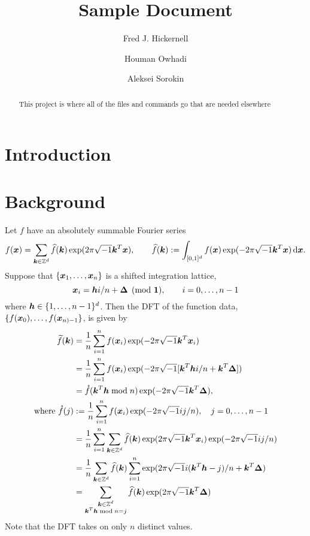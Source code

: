 \documentclass{amsart}
\begin{document}
\title{Sample Document}
\author{Fred J. Hickernell}
\author{Houman Owhadi}
\author{Aleksei Sorokin}
\begin{abstract}This project is where all of the files and commands go that are needed elsewhere
\end{abstract}

\maketitle

\section{Introduction}

\section{Background}
Let $f$ have an absolutely summable Fourier series
\begin{equation*}
    f(\boldsymbol{x}) = \sum_{\boldsymbol{k} \in \mathbb{Z}^d} \widehat{f}(\boldsymbol{k}) \exp(2 \pi \sqrt{-1} \boldsymbol{k}^T \boldsymbol{x}), \qquad \widehat{f}(\boldsymbol{k}) : = \int_{[0,1]^d} f(\boldsymbol{x})  \exp(-2 \pi \sqrt{-1} \boldsymbol{k}^T \boldsymbol{x}) \, {\rm d} \boldsymbol{x}.
\end{equation*}
Suppose that $\{ \boldsymbol{x}_1, \ldots, \boldsymbol{x}_n\}$ is a shifted integration lattice, 
\begin{equation*}
    \boldsymbol{x}_i = \boldsymbol{h} i /n + \boldsymbol{\Delta} \pmod {\boldsymbol{1}}, \qquad i = 0, \ldots, n - 1
\end{equation*}
where $\boldsymbol{h} \in \{1, \ldots, n-1\}^d$.  Then the DFT of the function data, $\{ f(\boldsymbol{x}_0), \ldots, f(\boldsymbol{x}_{n)-1}\}$, is given by 
\begin{align*}
    \widetilde{f}(\boldsymbol{k}) &= \frac 1n \sum_{i=1}^n f(\boldsymbol{x}_i) \exp(-2 \pi \sqrt{-1} \boldsymbol{k}^T \boldsymbol{x}_i) \\
    & = \frac 1n \sum_{i=1}^n f(\boldsymbol{x}_i) \exp(-2 \pi \sqrt{-1} [\boldsymbol{k}^T\boldsymbol{h} i/n + \boldsymbol{k}^T\boldsymbol{\Delta}]) \\
    & = \mathring{f}(\boldsymbol{k}^T \boldsymbol{h} \bmod n) \exp(-2 \pi \sqrt{-1} \boldsymbol{k}^T\boldsymbol{\Delta}), \\
    \text{where } 
    \mathring{f}(j) &: = \frac 1n \sum_{i=1}^n f(\boldsymbol{x}_i) \exp(-2 \pi \sqrt{-1} ij/n), \quad  j = 0, \ldots, n-1 \\
    & = \frac 1n \sum_{i=1}^n \sum_{\boldsymbol{k} \in \mathbb{Z}^d} \widehat{f}(\boldsymbol{k}) \exp(2 \pi \sqrt{-1} \boldsymbol{k}^T \boldsymbol{x}_i) \exp(-2 \pi \sqrt{-1} ij/n) \\
    & = \frac 1n \sum_{\boldsymbol{k} \in \mathbb{Z}^d} \widehat{f}(\boldsymbol{k}) \sum_{i=1}^n \exp(2 \pi \sqrt{-1} i (\boldsymbol{k}^T \boldsymbol{h} - j) /n + \boldsymbol{k}^T \boldsymbol{\Delta}) \\
    & = \sum_{\substack{\boldsymbol{k} \in \mathbb{Z}^d \\ \boldsymbol{k}^T \boldsymbol{h} \bmod n = j}} \widehat{f}(\boldsymbol{k}) \exp(2 \pi \sqrt{-1} \boldsymbol{k}^T \boldsymbol{\Delta}) \\
\end{align*}
Note that the DFT takes on only $n$ distinct values. 
\end{document}
